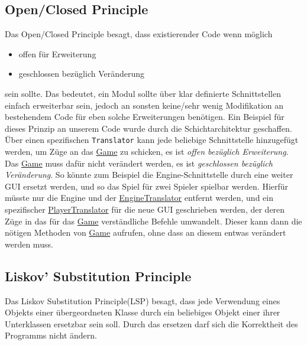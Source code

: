 \documentclass[
10pt, %
a4paper, %
oneside, %
headinclude,footinclude, %
BCOR5mm, %
]{scrartcl}
\begin{document}
\begin{onehalfspace}
\subsection{Open/Closed Principle}
Das Open/Closed Principle besagt, dass existierender Code wenn möglich
\begin{itemize}
	\item offen für Erweiterung
	\item geschlossen bezüglich Veränderung
\end{itemize}
sein sollte.
Das bedeutet, ein Modul sollte über klar definierte Schnittstellen einfach erweiterbar sein, jedoch an sonsten keine/sehr wenig Modifikation an bestehendem Code für eben solche Erweiterungen benötigen.
Ein Beispiel für dieses Prinzip an unserem Code wurde durch die Schichtarchitektur geschaffen. Über einen spezifischen \texttt{Translator} kann jede beliebige Schnittstelle hinzugefügt werden, um Züge an das \href{https://github.com/schmida736/Chess-AdvancedSE/blob/main/Chess-AdvancedSE/Game\%20Elements/Game.cs}{Game} zu schicken, es ist \textsl{offen bezüglich Erweiterung}. Das \href{https://github.com/schmida736/Chess-AdvancedSE/blob/main/Chess-AdvancedSE/Game\%20Elements/Game.cs}{Game} muss dafür nicht verändert werden, es ist \textsl{geschlossen bezüglich Veränderung}. So könnte zum Beispiel die Engine-Schnittstelle durch eine weiter GUI ersetzt werden, und so das Spiel für zwei Spieler spielbar werden. Hierfür müsste nur die Engine und der \href{https://github.com/schmida736/Chess-AdvancedSE/blob/main/Chess-AdvancedSE/Translators/EngineTranslator.cs}{EngineTranslator} entfernt werden, und ein spezifischer \href{https://github.com/schmida736/Chess-AdvancedSE/blob/main/Chess-AdvancedSE/Translators/PlayerTranslator.cs}{PlayerTranslator} für die neue GUI geschrieben werden, der deren Züge in das für das \href{https://github.com/schmida736/Chess-AdvancedSE/blob/main/Chess-AdvancedSE/Game\%20Elements/Game.cs}{Game} verständliche Befehle umwandelt. Dieser kann dann die nötigen Methoden von \href{https://github.com/schmida736/Chess-AdvancedSE/blob/main/Chess-AdvancedSE/Game\%20Elements/Game.cs}{Game} aufrufen, ohne dass an diesem entwas verändert werden muss.
\subsection{Liskov' Substitution Principle}
Das Liskov Substitution Principle(LSP) besagt, dass jede Verwendung eines Objekts einer übergeordneten Klasse durch ein beliebiges Objekt einer ihrer Unterklassen ersetzbar sein soll. Durch das ersetzen darf sich die Korrektheit des Programms nicht ändern.


\end{onehalfspace}
\end{document}
